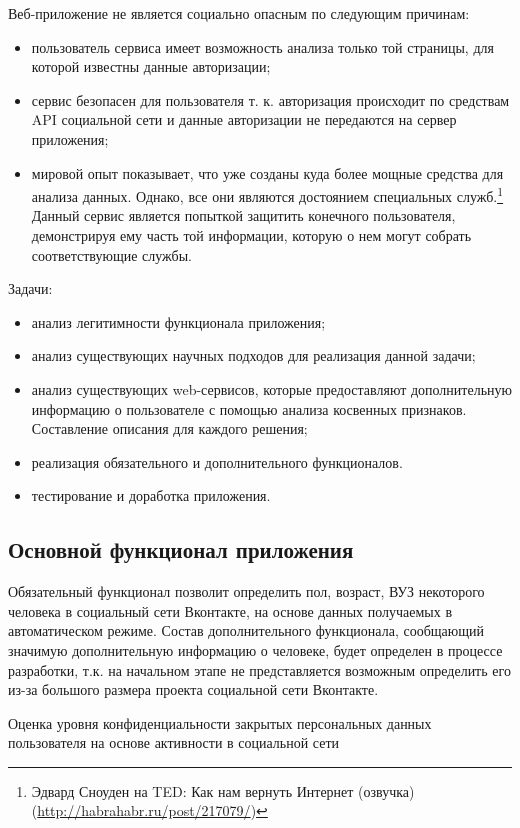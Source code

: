 Веб-приложение не является социально опасным по следующим причинам:
\begin{itemize}
\item пользователь сервиса имеет возможность анализа только той страницы, для которой известны данные авторизации;
\item сервис безопасен для пользователя т. к. авторизация происходит по средствам  API  социальной сети и данные авторизации не передаются на сервер приложения; 
\item мировой опыт показывает, что уже созданы куда более мощные средства для анализа данных. Однако, все они являются достоянием специальных служб.\footnote{Эдвард Сноуден на TED: Как нам вернуть Интернет (озвучка) (\url{http://habrahabr.ru/post/217079/})}
 Данный сервис является попыткой защитить конечного пользователя, демонстрируя ему часть той информации, которую о нем могут собрать соответствующие службы.
\end{itemize}

Задачи:
	\begin{itemize}
\item анализ легитимности функционала приложения;
\item анализ существующих научных подходов для реализация данной задачи;
\item анализ существующих web-сервисов, которые предоставляют дополнительную информацию о пользователе с помощью анализа косвенных признаков. Составление описания для каждого решения;
\item реализация обязательного и дополнительного функционалов.
\item тестирование и доработка приложения.
	\end{itemize}

\subsection{Основной функционал приложения}
Обязательный функционал позволит определить пол, возраст, ВУЗ некоторого человека в социальный сети Вконтакте, на основе данных получаемых в автоматическом режиме. Состав дополнительного функционала, сообщающий значимую дополнительную информацию о человеке,  будет определен в процессе разработки, т.к. на начальном этапе не представляется возможным определить его из-за большого размера проекта социальной сети Вконтакте.

Оценка уровня конфиденциальности закрытых персональных данных пользователя на основе активности в социальной сети
	
